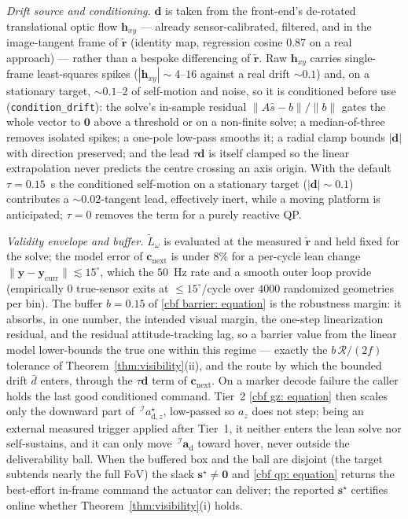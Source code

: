 \documentclass{IEEEtaes}
\theoremstyle{definition}
\theoremstyle{remark}
\begin{document}
\emph{Drift source and conditioning.} $\boldsymbol{d}$ is taken from the front-end's de-rotated translational optic flow $\boldsymbol{h}_{xy}$ --- already sensor-calibrated, filtered, and in the image-tangent frame of $\tilde{\boldsymbol{r}}$ (identity map, regression cosine $0.87$ on a real approach) --- rather than a bespoke differencing of $\tilde{\boldsymbol{r}}$. Raw $\boldsymbol{h}_{xy}$ carries single-frame least-squares spikes ($|\boldsymbol{h}_{xy}|\sim4$--$16$ against a real drift $\sim0.1$) and, on a stationary target, $\sim0.1$--$2$ of self-motion and noise, so it is conditioned before use (\texttt{condition\_drift}): the solve's in-sample residual $\|A\hat{s}-b\|/\|b\|$ gates the whole vector to $\boldsymbol{0}$ above a threshold or on a non-finite solve; a median-of-three removes isolated spikes; a one-pole low-pass smooths it; a radial clamp bounds $|\boldsymbol{d}|$ with direction preserved; and the lead $\tau\boldsymbol{d}$ is itself clamped so the linear extrapolation never predicts the centre crossing an axis origin. With the default $\tau=0.15$~s the conditioned self-motion on a stationary target ($|\boldsymbol{d}|\sim0.1$) contributes a $\sim0.02$-tangent lead, effectively inert, while a moving platform is anticipated; $\tau=0$ removes the term for a purely reactive QP.

\emph{Validity envelope and buffer.} $\tilde{L}_{\omega}$ is evaluated at the measured $\tilde{\boldsymbol{r}}$ and held fixed for the solve; the model error of $\boldsymbol{c}_\text{next}$ is under $8\%$ for a per-cycle lean change $\|\boldsymbol{y}-\boldsymbol{y}_\text{curr}\|\lesssim15^\circ$, which the $50$~Hz rate and a smooth outer loop provide (empirically $0$ true-sensor exits at $\le15^\circ$/cycle over $4000$ randomized geometries per bin). The buffer $b=0.15$ of \eqref{cbf barrier: equation} is the robustness margin: it absorbs, in one number, the intended visual margin, the one-step linearization residual, and the residual attitude-tracking lag, so a barrier value from the linear model lower-bounds the true one within this regime --- exactly the $b\,\mathcal{R}/(2f)$ tolerance of Theorem~\ref{thm:visibility}(ii), and the route by which the bounded drift $\bar{d}$ enters, through the $\tau\boldsymbol{d}$ term of $\boldsymbol{c}_\text{next}$. On a marker decode failure the caller holds the last good conditioned command. Tier~2 \eqref{cbf gz: equation} then scales only the downward part of $\,^\mathcal{I}a_{\text{d},z}^\star$, low-passed so $a_z$ does not step; being an external measured trigger applied after Tier~1, it neither enters the lean solve nor self-sustains, and it can only move $\,^\mathcal{I}\boldsymbol{a}_\text{d}$ toward hover, never outside the deliverability ball. When the buffered box and the ball are disjoint (the target subtends nearly the full FoV) the slack $\boldsymbol{s}^\star\neq\boldsymbol{0}$ and \eqref{cbf qp: equation} returns the best-effort in-frame command the actuator can deliver; the reported $\boldsymbol{s}^\star$ certifies online whether Theorem~\ref{thm:visibility}(i) holds.
\end{document}
